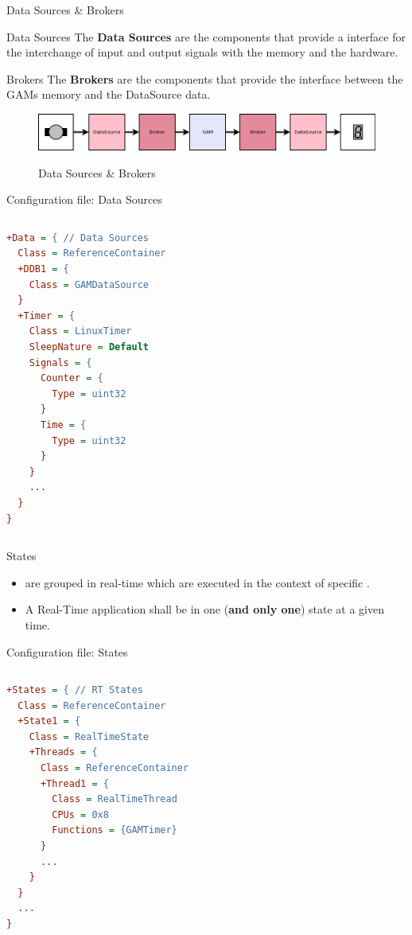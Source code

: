\begin{frame}{Data Sources \& Brokers}
	\begin{block}{Data Sources}
		The \textbf{Data Sources} are the components that provide a interface for the interchange of input and output signals with the memory and the hardware.
	\end{block}
	\begin{block}{Brokers}
		The \textbf{Brokers} are the components that provide the interface between the GAMs memory and the DataSource data.
	\end{block}
	\begin{figure}
		\centering
		\includegraphics[scale=.35]{DataSources.png}
		\label{fig:datasources}
		\caption{Data Sources \& Brokers}
	\end{figure}
\end{frame}

\begin{frame}[fragile]{Configuration file: Data Sources}
	\begin{columns}
		\begin{lstlisting}[style=small, language=cfg]
+Data = { // Data Sources
  Class = ReferenceContainer
  +DDB1 = {
    Class = GAMDataSource
  }
  +Timer = {
    Class = LinuxTimer
    SleepNature = Default
    Signals = {
      Counter = {
	    Type = uint32
	  }
      Time = {
        Type = uint32
      }
    }
	...
  }
}\end{lstlisting}
	\end{columns}
\end{frame}

\begin{frame}{States}
	\begin{itemize}
		\item {} are grouped in real-time  which are executed in the context of specific .
		\item A Real-Time application shall be in one (\textbf{and only one}) state at a given time.
	\end{itemize}
\end{frame}
\begin{frame}[fragile]{Configuration file: States}
	\begin{columns}
		\begin{lstlisting}[style=small, language=cfg]
+States = { // RT States
  Class = ReferenceContainer
  +State1 = {
    Class = RealTimeState
    +Threads = {
      Class = ReferenceContainer
      +Thread1 = {
        Class = RealTimeThread
        CPUs = 0x8
        Functions = {GAMTimer}
      }
      ...
    }
  }
  ...
}\end{lstlisting}
	\end{columns}
\end{frame}

